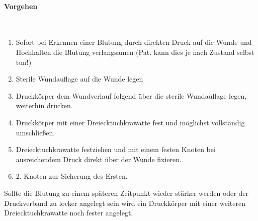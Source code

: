 \paragraph*{Vorgehen}~

\begin{enumerate}
    \item Sofort bei Erkennen einer  Blutung durch
    direkten Druck auf die Wunde und Hochhalten die Blutung verlangsamen (Pat. kann dies je
    nach Zustand selbst tun!)
    \item Sterile Wundauflage auf die Wunde legen
    \item Druckkörper dem Wundverlauf folgend über die sterile
    Wundauflage legen, weiterhin drücken.
    \item Druckkörper mit einer Dreiecktuchkrawatte fest und möglichst
    vollständig umschließen.
    \item Dreiecktuchkrawatte festziehen und mit einem festen Knoten bei
    ausreichendem Druck direkt über der Wunde fixieren.
    \item 2. Knoten zur Sicherung des Ersten.
\end{enumerate}

Sollte die Blutung zu einem späteren Zeitpunkt wieder
stärker werden oder der Druckverband zu locker angelegt
sein wird ein  Druckkörper mit einer
weiteren Dreiecktuchkrawatte noch fester angelegt. 



